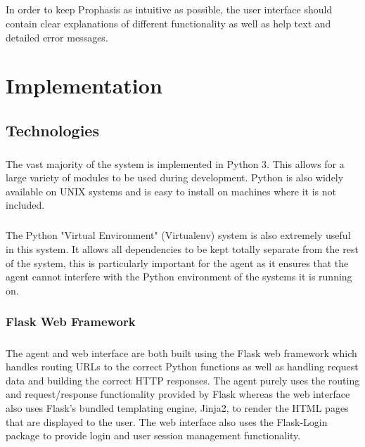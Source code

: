 \documentclass[bsc,logo,twoside,singlespacing]{infthesis}
\begin{document}
\paragraph*{}
	In order to keep Prophasis as intuitive as possible, the user interface should
	contain clear explanations of different functionality as well as help text and
	detailed error messages.

\chapter{Implementation}
\section{Technologies}
\paragraph*{}
	The vast majority of the system is implemented in Python 3.  This allows for a
	large variety of modules to be used during development. Python is also widely
	available on UNIX systems and is easy to install on machines where it is not
	included.

\paragraph*{}
	The Python "Virtual Environment" (Virtualenv) system is also extremely useful
	in this system.  It allows all dependencies to be kept totally separate from
	the rest of the system, this is particularly important for the agent as it
	ensures that the agent cannot interfere with the Python environment of the
	systems it is running on.

\subsection{Flask Web Framework}
\paragraph*{}
	The agent and web interface are both built using the Flask web framework which
	handles routing URLs to the correct Python functions as well as handling
	request data and building the correct HTTP responses. The agent purely uses the
	routing and request/response functionality provided by Flask whereas the web
	interface also uses Flask's bundled templating engine, Jinja2, to render the
	HTML pages that are displayed to the user. The web interface also uses the
	Flask-Login package to provide login and user session management functionality.
\end{document}
